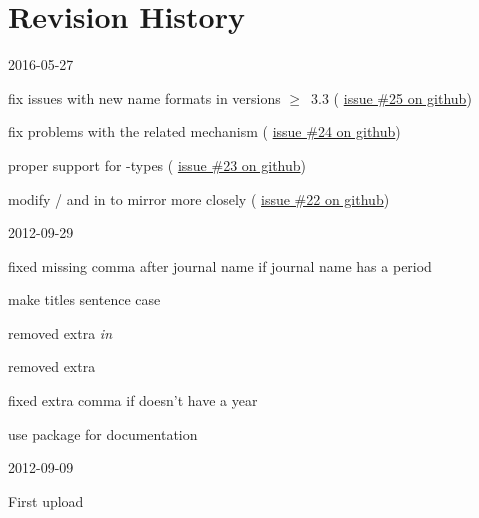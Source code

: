\documentclass{ltxdockit}[2011/03/25]
\newcommand*{\gitissuelink}[1]{%
  \href{https://github.com/moewew/biblatex-trad/issues/#1}{issue \##1 on github}}
\begin{document}
\section{Revision History}\label{apx:log}
\begin{changelog}
\begin{release}{0.3}{2016-05-27}
\item fix issues with new name formats in  versions $\geq$~3.3 (\gitissuelink{25})
\item fix problems with the related mechanism (\gitissuelink{24})
\item proper support for -types (\gitissuelink{23})
\item modify / and  in  to mirror  more closely (\gitissuelink{22})
\end{release}

\begin{release}{0.2}{2012-09-29}
\item fixed missing comma after journal name if journal name has a period
\item make titles sentence case
\item removed extra \emph{in}
\item removed extra 
\item fixed extra comma if  doesn't have a year
\item use package  for documentation
\end{release}

\begin{release}{0.1}{2012-09-09}
\item First upload
\end{release}
\end{changelog}
\end{document}
